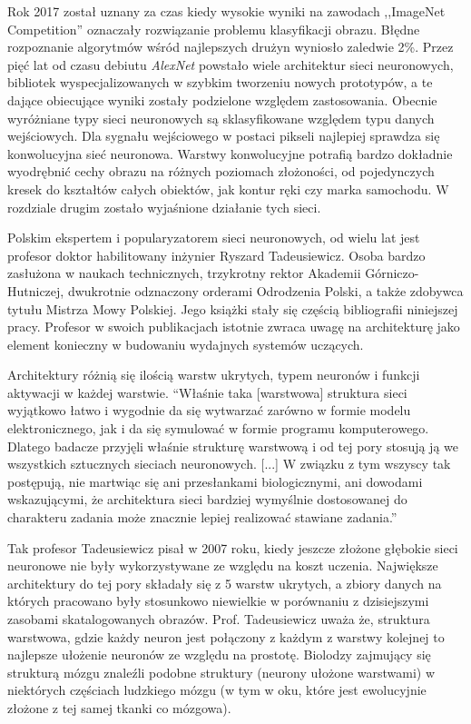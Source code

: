 \documentclass[12pt,a4paper,twoside,titlepage,openright]{book}
\begin{document}
Rok 2017 został uznany za czas kiedy wysokie wyniki na zawodach ,,ImageNet Competition'' oznaczały rozwiązanie problemu klasyfikacji obrazu. Błędne rozpoznanie algorytmów wśród najlepszych drużyn wyniosło zaledwie 2\%. Przez pięć lat od czasu debiutu \textit{AlexNet} powstało wiele architektur sieci neuronowych, bibliotek wyspecjalizowanych w szybkim tworzeniu nowych prototypów, a te dające obiecujące wyniki zostały podzielone względem zastosowania. Obecnie wyróżniane typy sieci neuronowych są sklasyfikowane względem typu danych wejściowych. Dla sygnału wejściowego w postaci pikseli najlepiej sprawdza się konwolucyjna sieć neuronowa. Warstwy konwolucyjne potrafią bardzo dokładnie wyodrębnić cechy obrazu na różnych poziomach złożoności, od pojedynczych kresek do kształtów całych obiektów, jak kontur ręki czy marka samochodu. W rozdziale drugim zostało wyjaśnione działanie tych sieci.

Polskim ekspertem i popularyzatorem sieci neuronowych, od wielu lat jest profesor doktor habilitowany inżynier Ryszard Tadeusiewicz. Osoba bardzo zasłużona w naukach technicznych, trzykrotny rektor Akademii Górniczo-Hutniczej, dwukrotnie odznaczony orderami Odrodzenia Polski, a także zdobywca tytułu Mistrza Mowy Polskiej. Jego książki stały się częścią bibliografii niniejszej pracy. Profesor w swoich publikacjach istotnie zwraca uwagę na architekturę jako element konieczny w budowaniu wydajnych systemów uczących.

Architektury różnią się ilością warstw ukrytych, typem neuronów i funkcji aktywacji w każdej warstwie.
“Właśnie taka [warstwowa] struktura sieci wyjątkowo łatwo i wygodnie da się wytwarzać zarówno w formie modelu elektronicznego, jak i da się symulować w formie programu komputerowego. Dlatego badacze przyjęli właśnie strukturę warstwową i od tej pory stosują ją we wszystkich sztucznych sieciach neuronowych. [...] W związku z tym wszyscy tak postępują, nie martwiąc się ani przesłankami biologicznymi, ani dowodami wskazującymi, że architektura sieci bardziej wymyślnie dostosowanej do charakteru zadania może znacznie lepiej realizować stawiane zadania.”

Tak profesor Tadeusiewicz pisał w 2007 roku, kiedy jeszcze złożone głębokie sieci neuronowe nie były wykorzystywane ze względu na koszt uczenia. Największe architektury do tej pory składały się z 5 warstw ukrytych, a zbiory danych na których pracowano były stosunkowo niewielkie w porównaniu z dzisiejszymi zasobami skatalogowanych obrazów. Prof. Tadeusiewicz uważa że, struktura warstwowa, gdzie każdy neuron jest połączony z każdym z warstwy kolejnej to najlepsze ułożenie neuronów ze względu na prostotę. Biolodzy zajmujący się strukturą mózgu znaleźli podobne struktury (neurony ułożone warstwami) w niektórych częściach ludzkiego mózgu (w tym w oku, które jest ewolucyjnie złożone z tej samej tkanki co mózgowa).
\end{document}
